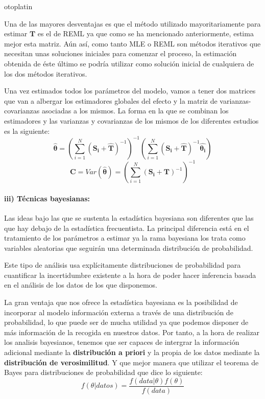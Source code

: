 otoplatin\documentclass[a4paper,openright,12pt]{report}
\begin{document}
Una de las mayores desventajas es que el método utilizado mayoritariamente para estimar $\mathbf{T}$ es el de REML ya que como se ha mencionado anteriormente, estima mejor esta matriz. Aún así, como tanto MLE o REML son métodos iterativos que necesitan unas soluciones iniciales para comenzar el proceso, la estimación obtenida de éste último se podría utilizar como solución inicial de cualquiera de los dos métodos iterativos.

Una vez estimados todos los parámetros del modelo, vamos a tener dos matrices que van a albergar los estimadores globales del efecto y la matriz de varianzas-covarianzas asociadas a los mismos. La forma en la que se combinan los estimadores y las varianzas y covarianzas de los mismos de los diferentes estudios es la siguiente:
\begin{equation}
\mathbf{\widehat{\theta}}=(\sum_{i=1}^{N}(\mathbf{S_{i}}+\mathbf{\widehat{T}})^{-1})^{-1}(\sum_{i=1}^{N}(\mathbf{S_{i}}+\mathbf{\widehat{T}})^{-1}\mathbf{\widehat{\theta_{i}}})
\label{estinador_efectos}
\end{equation}
\begin{equation}
\mathbf{C}=Var(\mathbf{\widehat{\theta}})=(\sum_{i=1}^{N}(\mathbf{S_{i}}+\mathbf{T})^{-1})^{-1}
\label{est_var_cov}
\end{equation}
\newpage
\paragraph{iii) Técnicas bayesianas:} Las ideas bajo las que se sustenta la estadística bayesiana son diferentes que las que hay debajo de la estadística frecuentista. La principal diferencia está en el tratamiento de los parámetros a estimar ya la rama bayesiana los trata como variables aleatorias que seguirán una determinada distribución de probabilidad.

Este tipo de análisis usa explícitamente distribuciones de probabilidad para cuantificar la incertidumbre existente a la hora de poder hacer inferencia basada en el análisis de los datos de los que disponemos.

La gran ventaja que nos ofrece la estadística bayesiana es la posibilidad de incorporar al modelo información externa a través de una distribución de probabilidad, lo que puede ser de mucha utilidad ya que podemos disponer de más información de la recogida en nuestros datos. Por tanto, a la hora de realizar los analisis bayesianos, tenemos que ser capaces de intergrar la información adicional mediante la \textbf{distribución a priori} y la propia de los datos mediante la \textbf{distribución de verosimilitud}. Y que mejor manera que utilizar el teorema de Bayes para distribuciones de probabilidad que dice lo siguiente:
\begin{equation}
f(\theta \vert datos)=\frac{f(data\vert \theta)f(\theta)}{f(data)}
\label{bayes}
\end{equation}
\end{document}
